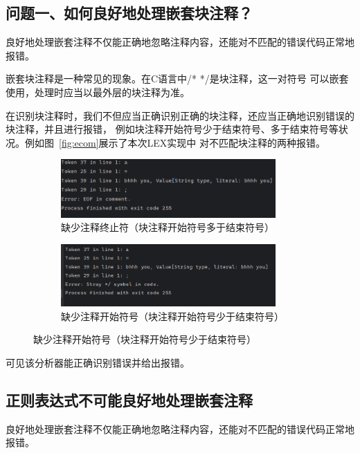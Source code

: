 \documentclass[a4paper,twoside]{article}
\begin{document}
\begin{spacing}{1.2}
\section{问题一、如何良好地处理嵌套块注释？}

良好地处理嵌套注释不仅能正确地忽略注释内容，还能对不匹配的错误代码正常地报错。

嵌套块注释是一种常见的现象。在C语言中/* */是块注释，这一对符号
可以嵌套使用，处理时应当以最外层的块注释为准。

在识别块注释时，我们不但应当正确识别正确的块注释，还应当正确地识别错误的块注释，并且进行报错，
例如块注释开始符号少于结束符号、多于结束符号等状况。例如图~\ref{fig:ecom}展示了本次LEX实现中
对不匹配块注释的两种报错。
\begin{figure}[htb]
	\centering
	\caption{错误注释的情况}
	\label{fig:ecom}
	\begin{subfigure}[b]{0.4\textwidth}
		\centering
		\includegraphics[width=0.9\textwidth]{images/morestart.png}
		\caption{缺少注释终止符（块注释开始符号多于结束符号）}
	\end{subfigure}
	\begin{subfigure}[b]{0.4\textwidth}
		\centering
		\includegraphics[width=0.9\textwidth]{images/moreend.png}
		\caption{缺少注释开始符号（块注释开始符号少于结束符号）}
	\end{subfigure}
\end{figure}
可见该分析器能正确识别错误并给出报错。

\subsection{正则表达式\textbf{不可能}良好地处理嵌套注释}

良好地处理嵌套注释不仅能正确地忽略注释内容，还能对不匹配的错误代码正常地报错。


\end{spacing}
\end{document}
